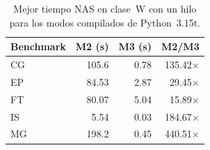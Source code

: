 \begin{table}[htbp]
\centering
\small
\begin{tabular}{lrrr}
\hline
Benchmark & M2 (s) & M3 (s) & M2/M3 \\
\hline
CG & 105.6 & 0.78 & 135.42$\times$ \\
EP & 84.53 & 2.87 & 29.45$\times$ \\
FT & 80.07 & 5.04 & 15.89$\times$ \\
IS & 5.54 & 0.03 & 184.67$\times$ \\
MG & 198.2 & 0.45 & 440.51$\times$ \\
\hline
\end{tabular}
\caption{Mejor tiempo NAS en clase~W con un hilo para los modos compilados de Python~3.15t.}
\label{tab:resultados-w-t1-modos}
\end{table}
